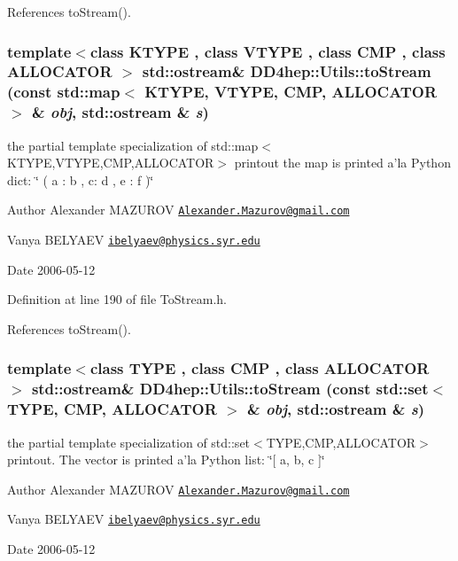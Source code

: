 References toStream().\hypertarget{namespace_d_d4hep_1_1_utils_ab3abfe8b64637c8b7f60266886d8ab75}{
\subsubsection[{toStream}]{\setlength{\rightskip}{0pt plus 5cm}template$<$class KTYPE , class VTYPE , class CMP , class ALLOCATOR $>$ std::ostream\& DD4hep::Utils::toStream (const std::map$<$ KTYPE, VTYPE, CMP, ALLOCATOR $>$ \& {\em obj}, \/  std::ostream \& {\em s})}}
\label{namespace_d_d4hep_1_1_utils_ab3abfe8b64637c8b7f60266886d8ab75}
the partial template specialization of {\ttfamily std::map$<$KTYPE,VTYPE,CMP,ALLOCATOR$>$} printout the map is printed a'la Python dict: \char`\"{} ( a : b , c: d , e : f )\char`\"{} \begin{DoxyAuthor}{Author}
Alexander MAZUROV \href{mailto:Alexander.Mazurov@gmail.com}{\tt Alexander.Mazurov@gmail.com} 

Vanya BELYAEV \href{mailto:ibelyaev@physics.syr.edu}{\tt ibelyaev@physics.syr.edu} 
\end{DoxyAuthor}
\begin{DoxyDate}{Date}
2006-\/05-\/12 
\end{DoxyDate}


Definition at line 190 of file ToStream.h.

References toStream().\hypertarget{namespace_d_d4hep_1_1_utils_a31e3105c511f5f5e359d2bcc119a64a8}{
\subsubsection[{toStream}]{\setlength{\rightskip}{0pt plus 5cm}template$<$class TYPE , class CMP , class ALLOCATOR $>$ std::ostream\& DD4hep::Utils::toStream (const std::set$<$ TYPE, CMP, ALLOCATOR $>$ \& {\em obj}, \/  std::ostream \& {\em s})}}
\label{namespace_d_d4hep_1_1_utils_a31e3105c511f5f5e359d2bcc119a64a8}
the partial template specialization of {\ttfamily std::set$<$TYPE,CMP,ALLOCATOR$>$} printout. The vector is printed a'la Python list: \char`\"{}\mbox{[} a, b, c \mbox{]}\char`\"{} \begin{DoxyAuthor}{Author}
Alexander MAZUROV \href{mailto:Alexander.Mazurov@gmail.com}{\tt Alexander.Mazurov@gmail.com} 

Vanya BELYAEV \href{mailto:ibelyaev@physics.syr.edu}{\tt ibelyaev@physics.syr.edu} 
\end{DoxyAuthor}
\begin{DoxyDate}{Date}
2006-\/05-\/12 
\end{DoxyDate}



